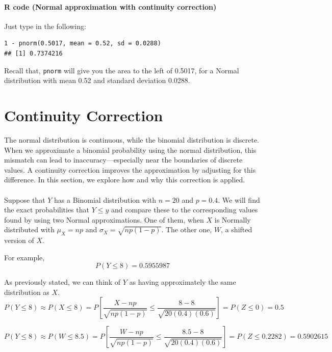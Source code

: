 \begin{example}
\paragraph*{R code (Normal approximation with continuity correction)}

Just type in the following:

\begin{verbatim}
1 - pnorm(0.5017, mean = 0.52, sd = 0.0288)
## [1] 0.7374216
\end{verbatim}

Recall that, \texttt{pnorm} will give you the area to the left of 0.5017, for a Normal distribution with mean 0.52 and standard deviation 0.0288.
\end{example}
\section{Continuity Correction}
The normal distribution is continuous, while the binomial distribution is discrete. When we approximate a binomial probability using the normal distribution, this mismatch can lead to inaccuracy—especially near the boundaries of discrete values. A continuity correction improves the approximation by adjusting for this difference. In this section, we explore how and why this correction is applied. \\
\vspace{0.5em} \\
Suppose that $Y$ has a Binomial distribution with $n = 20$ and $p = 0.4$. We will find the exact probabilities that $Y \leq y$ and compare these to the corresponding values found by using two Normal approximations. One of them, when $X$ is Normally distributed with $\mu_X = np$ and $\sigma_X = \sqrt{np(1 - p)}$.
\vspace{1em}
The other one, $W$, a shifted version of $X$.

\vspace{1em}

For example,
\[
P(Y \leq 8) = 0.5955987
\]

As previously stated, we can think of $Y$ as having approximately the same distribution as $X$.
\[
P(Y \leq 8) \approx P(X \leq 8)
= P\left[ \frac{X - np}{\sqrt{np(1 - p)}} \leq \frac{8 - 8}{\sqrt{20(0.4)(0.6)}} \right]
= P(Z \leq 0) = 0.5
\]

\vspace{1em}

\[
P(Y \leq 8) \approx P(W \leq 8.5)
= P\left[ \frac{W - np}{\sqrt{np(1 - p)}} \leq \frac{8.5 - 8}{\sqrt{20(0.4)(0.6)}} \right]
= P(Z \leq 0.2282) = 0.5902615
\]

